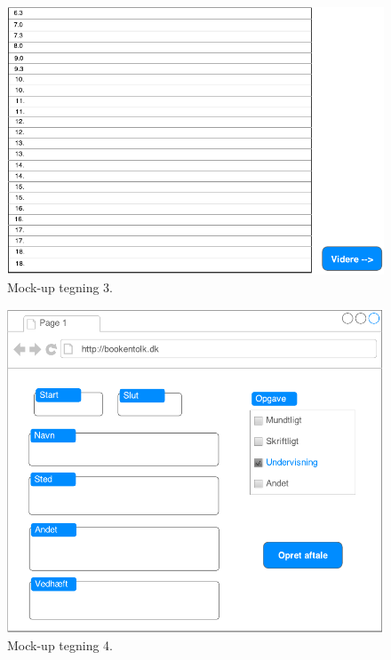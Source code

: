 \documentclass[12pt]{article}   %
\begin{document}
\newpage

\begin{figure}[!ht]
\begin{center}
\includegraphics{mock3.pdf}
\caption{Mock-up tegning 3.}
\end{center}
\end{figure}


\newpage

\begin{figure}[!ht]
\begin{center}
\includegraphics{mock4.pdf}
\caption{Mock-up tegning 4.}
\end{center}
\end{figure}
\end{document}
